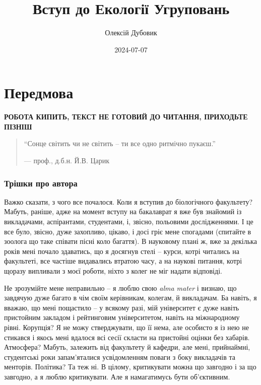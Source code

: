 \documentclass[
  11pt,
]{book}
\title{Вступ до Екології Угруповань}
\author{Олексій Дубовик}
\date{2024-07-07}
\begin{document}
\frontmatter
\maketitle

\mainmatter
\chapter*{Передмова}\label{ux43fux435ux440ux435ux434ux43cux43eux432ux430}

\textbf{{РОБОТА КИПИТЬ, ТЕКСТ НЕ ГОТОВИЙ ДО ЧИТАННЯ, ПРИХОДЬТЕ ПІЗНІШ}}

\begin{quote}
``Сонце світить чи не світить -- ти все одно ритмічно пукаєш.''

--- проф., д.б.н. Й.В. Царик
\end{quote}

\subsection{Трішки про автора}\label{about-author}

Важко сказати, з чого все почалося. Коли я вступив до біологічного
факультету? Мабуть, раніше, адже на момент вступу на бакалаврат я вже
був знайомий із викладачами, аспірантами, студентами, і, звісно,
польовими дослідженнями. І це все було, звісно, дуже захопливо, цікаво,
і досі гріє мене спогадами (спитайте в зоолога що таке співати пісні
коло багаття). В науковому плані ж, вже за декілька років мені почало
здаватись, що я досягнув стелі -- курси, котрі читались на факультеті,
все частіше видавались втратою часу, а на наукові питання, котрі щоразу
випливали з моєї роботи, ніхто з колег не міг надати відповіді.

Не зрозумійте мене неправильно -- я люблю свою \emph{alma mater} і
визнаю, що завдячую дуже багато в чім своїм керівникам, колегам, й
викладачам. Ба навіть, я вважаю, що мені пощастило -- у всякому разі,
мій університет є дуже навіть пристойним закладом і рейтинговим
університетом, навіть на міжнародному рівні. Корупція? Я не можу
стверджувати, що її нема, але особисто я із нею не стикався і якось мені
вдалося всі сесії скласти на пристойні оцінки без хабарів. Атмосфера?
Мабуть, залежить від факультету й кафедри, але мені, прийнаймні,
студентські роки запам'яталися усвідомленням поваги з боку викладачів та
менторів. Політика? Та теж ні. В цілому, критикувати можна що завгодно і
за що завгодно, а я люблю критикувати. Але я намагатимусь бути
об'єктивним.
\end{document}
